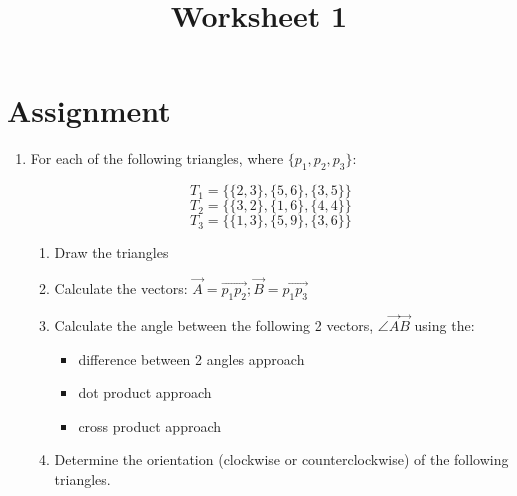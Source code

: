 \documentclass[a4paper,12pt]{article}
\title{Worksheet 1}
\begin{document}
\maketitle

\worksheetGroundRules

\worksheetSubmission

\vspace{3pt}
\section{Assignment} 



\begin{enumerate}

\item For each of the following triangles, where $\{p_1,p_2,p_3\}$:

\vspace{-10pt}
$$T_1=\{\{2,3\},\{5,6\},\{3,5\}\}$$
$$T_2=\{\{3,2\},\{1,6\},\{4,4\}\}$$
$$T_3=\{\{1,3\},\{5,9\},\{3,6\}\}$$


\begin{enumerate}
\item Draw the triangles

\item Calculate the vectors: $\overrightarrow{A} = \overrightarrow{p_1p_2}; \overrightarrow{B} = \overrightarrow{p_1p_3}$

\item Calculate the angle between the following 2 vectors, $\angle\overrightarrow{A}\overrightarrow{B}$ using the:

\begin{itemize}
\item difference between 2 angles approach
\item dot product approach
\item cross product approach
\end{itemize}

\item Determine the orientation (clockwise or counterclockwise) of the following triangles.


\end{enumerate}
\end{enumerate}
\end{document}
